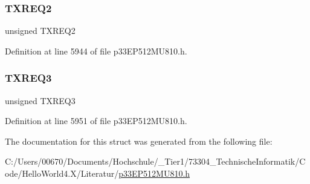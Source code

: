 \mbox{\label{structtag_c2_t_r23_c_o_n_b_i_t_s_ab6c9ac0d87cabb9c2ec33ae25d6597a7}} 
\subsubsection{\texorpdfstring{T\+X\+R\+E\+Q2}{TXREQ2}}
{\footnotesize\ttfamily unsigned T\+X\+R\+E\+Q2}



Definition at line 5944 of file p33\+E\+P512\+M\+U810.\+h.

\mbox{\label{structtag_c2_t_r23_c_o_n_b_i_t_s_a47e1fc4fb58ee84e505cba762a6d1acf}} 
\subsubsection{\texorpdfstring{T\+X\+R\+E\+Q3}{TXREQ3}}
{\footnotesize\ttfamily unsigned T\+X\+R\+E\+Q3}



Definition at line 5951 of file p33\+E\+P512\+M\+U810.\+h.



The documentation for this struct was generated from the following file\+:\begin{DoxyCompactItemize}
\item 
C\+:/\+Users/00670/\+Documents/\+Hochschule/\+\_\+\+Tier1/73304\+\_\+\+Technische\+Informatik/\+Code/\+Hello\+World4.\+X/\+Literatur/\hyperlink{p33_e_p512_m_u810_8h}{p33\+E\+P512\+M\+U810.\+h}\end{DoxyCompactItemize}

